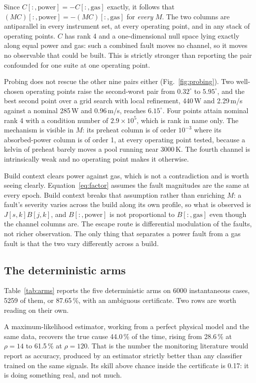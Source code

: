 \documentclass[preprint,12pt]{elsarticle}
\begin{document}
Since $C[:,\mathrm{power}] = -C[:,\mathrm{gas}]$ exactly, it follows that
$(MC)[:,\mathrm{power}] = -(MC)[:,\mathrm{gas}]$ for \emph{every} $M$. The two
columns are antiparallel in every instrument set, at every operating point, and
in any stack of operating points. $C$ has rank 4 and a one-dimensional null
space lying exactly along equal power and gas: such a combined fault moves no
channel, so it moves no observable that could be built. This is strictly
stronger than reporting the pair confounded for one suite at one operating
point.

Probing does not rescue the other nine pairs either (Fig.~\ref{fig:probing}).
Two well-chosen operating points raise the second-worst pair from $0.32^\circ$
to $5.95^\circ$, and the best second point over a grid search with local
refinement, 440\,W and 2.29\,m/s against a nominal 285\,W and 0.96\,m/s, reaches
$6.15^\circ$. Four points attain nominal rank 4 with a condition number of
$2.9\times10^{5}$, which is rank in name only. The mechanism is visible in $M$:
its preheat column is of order $10^{-3}$ where its absorbed-power column is of
order 1, at every operating point tested, because a kelvin of preheat barely
moves a pool running near 3000\,K. The fourth channel is intrinsically weak and
no operating point makes it otherwise.

Build context clears power against gas, which is not a contradiction and is
worth seeing clearly. Equation~\eqref{eq:factor} assumes the fault magnitudes
are the same at every epoch. Build context breaks that assumption rather than
enriching $M$: a fault's severity varies across the build along its own profile,
so what is observed is $J[s,k]B[j,k]$, and $B[:,\mathrm{power}]$ is not
proportional to $B[:,\mathrm{gas}]$ even though the channel columns are. The
escape route is differential modulation of the faults, not richer observation.
The only thing that separates a power fault from a gas fault is that the two
vary differently across a build.

\subsection{The deterministic arms}
\label{sec:arms}

Table~\ref{tab:arms} reports the five deterministic arms on 6000 instantaneous
cases, 5259 of them, or 87.65\,\%, with an ambiguous certificate. Two rows are worth
reading on their own.

A maximum-likelihood estimator, working from a perfect physical model and the
same data, recovers the true cause 44.0\,\% of the time, rising from 28.6\,\% at
$\rho = 14$ to 61.5\,\% at $\rho = 120$. That is the number the monitoring
literature would report as accuracy, produced by an estimator strictly better
than any classifier trained on the same signals. Its skill above chance inside
the certificate is 0.17: it is doing something real, and not much.
\end{document}
